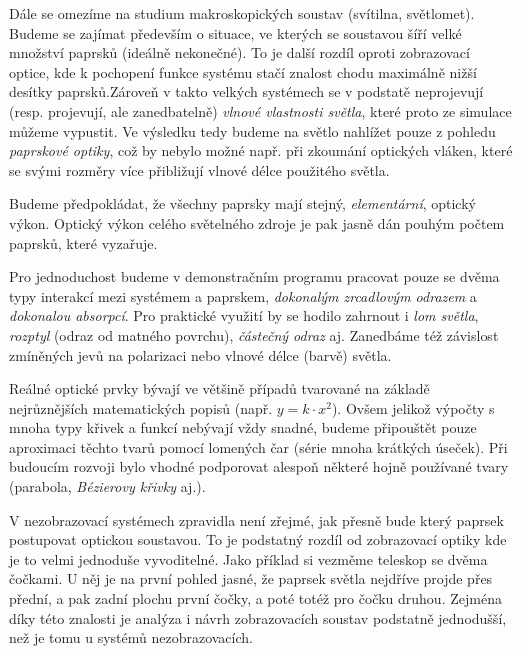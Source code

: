 Dále se omezíme na studium makroskopických soustav (svítilna, světlomet). Budeme se zajímat především o situace, ve kterých se soustavou šíří velké množství paprsků (ideálně nekonečné). To je další rozdíl oproti zobrazovací optice, kde k pochopení fun\-kce systému stačí znalost chodu maximálně nižší desítky paprsků.\src Zároveň v takto velkých systémech se v podstatě neprojevují (resp. projevují, ale zanedbatelně) \emph{vlnové vlastnosti světla}, které proto ze simulace můžeme vypustit. Ve výsledku tedy budeme na světlo nahlížet pouze z pohledu \emph{paprskové optiky}, což by nebylo možné např. při zkoumání optických vláken, které se svými rozměry více přibližují vlnové délce použitého světla.

Budeme předpokládat, že všechny paprsky mají stejný, \emph{elementární}, optický výkon. Optický výkon celého světelného zdroje je pak jasně dán pouhým počtem paprsků, které vyzařuje.

Pro jednoduchost budeme v demonstračním programu pracovat pouze se dvěma typy interakcí mezi systémem a paprskem, \emph{dokonalým zrcadlovým odrazem} a \emph{dokonalou absorpcí}. Pro praktické využití by se hodilo zahrnout i \emph{lom světla}, \emph{rozptyl} (odraz od matného povrchu), \emph{částečný odraz} aj. Zanedbáme též závislost zmíněných jevů na polarizaci nebo vlnové délce (barvě) světla.



Reálné optické prvky bývají ve většině případů tvarované na základě nejrůznějších matematických popisů (např. $y = k \cdot x^2$). Ovšem jelikož výpočty s mnoha typy křivek a funkcí nebývají vždy snadné, budeme připouštět pouze aproximaci těchto tvarů pomocí lomených čar (série mnoha krátkých úseček). Při budoucím rozvoji bylo vhodné podporovat alespoň některé hojně používané tvary (parabola, \emph{Bézierovy křivky} aj.).


V nezobrazovací systémech zpravidla není zřejmé, jak přesně bude který paprsek postupovat optickou soustavou. To je podstatný rozdíl od zobrazovací optiky kde je to velmi jednoduše vyvoditelné. Jako příklad si vezměme teleskop se dvěma čočkami. U něj je na první pohled jasné, že paprsek světla nejdříve projde přes přední, a pak zadní plochu první čočky, a poté totéž pro čočku druhou. Zejména díky této znalosti je analýza i návrh zobrazovacích soustav podstatně jednodušší, než je tomu u systémů nezobrazovacích.
